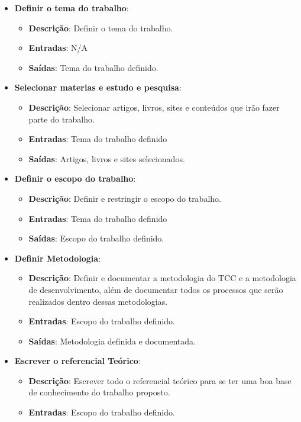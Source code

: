 \begin{itemize}
  \item \textbf{Definir o tema do trabalho}:
  \begin{itemize}
    \item \textbf{Descrição}: Definir o tema do trabalho.
    \item \textbf{Entradas}: N/A
    \item \textbf{Saídas}: Tema do trabalho definido.
  \end{itemize}
  \item \textbf{Selecionar materias e estudo e pesquisa}:
  \begin{itemize}
    \item \textbf{Descrição}: Selecionar artigos, livros, sites e conteúdos que irão fazer parte do trabalho.
    \item \textbf{Entradas}: Tema do trabalho definido
    \item \textbf{Saídas}: Artigos, livros e sites selecionados.
  \end{itemize}
  \item \textbf{Definir o escopo do trabalho}:
  \begin{itemize}
    \item \textbf{Descrição}: Definir e restringir o escopo do trabalho.
    \item \textbf{Entradas}: Tema do trabalho definido
    \item \textbf{Saídas}: Escopo do trabalho definido.
  \end{itemize}
  \item \textbf{Definir Metodologia}:
  \begin{itemize}
    \item \textbf{Descrição}: Definir e documentar a metodologia do TCC e a metodologia de desenvolvimento, além de
      documentar todos os processos que serão realizados dentro dessas metodologias.
    \item \textbf{Entradas}: Escopo do trabalho definido.
    \item \textbf{Saídas}: Metodologia definida e documentada.
  \end{itemize}
  \item \textbf{Escrever o referencial Teórico}:
  \begin{itemize}
    \item \textbf{Descrição}: Escrever todo o referencial teórico para se ter uma boa base de conhecimento do trabalho
      proposto.
    \item \textbf{Entradas}: Escopo do trabalho definido.

\end{itemize}
\end{itemize}

